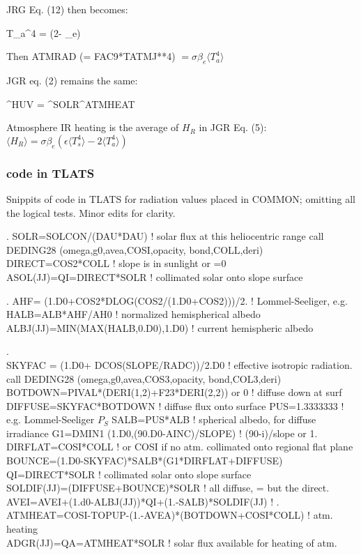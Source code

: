 JRG Eq. (12) then becomes:

 \qbn \langle T_a^4 \rangle =  
{ \sigma (2- \epsilon \beta_e) }   

 Then ATMRAD (= FAC9*TATMJ**4) $= \sigma \beta_e  \langle T_a^4 \rangle $  

JGR eq. (2) remains the same:

\qbn {}^{HUV} = ^{SOLR}^{ATMHEAT} 


Atmosphere IR heating is the average of $H_R$ in JGR Eq. (5): 
$ \langle H_R \rangle = \sigma \beta_e \left( \epsilon  \langle T_s^4 \rangle - 2 \langle T_a^4 \rangle \right) $

\subsubsection{code in TLATS}
Snippits of code in TLATS for radiation values placed in COMMON; omitting all the logical tests.  Minor edits for clarity.

.
\qi  SOLR=SOLCON/(DAU*DAU)     ! solar flux at this heliocentric range
\qi  call DEDING28 (omega,g0,avea,COSI,opacity, bond,COLL,deri)
\qi  DIRECT=COS2*COLL     ! slope is in sunlight  or =0
 \\ ASOL(JJ)=QI=DIRECT*SOLR         ! collimated solar onto slope surface

.
\qi  AHF= (1.D0+COS2*DLOG(COS2/(1.D0+COS2)))/2. ! Lommel-Seeliger, e.g.
\qi  HALB=ALB*AHF/AH0     ! normalized hemispherical albedo
\\ ALBJ(JJ)=MIN(MAX(HALB,0.D0),1.D0) ! current hemispheric albedo

.
\\ SKYFAC = (1.D0+ DCOS(SLOPE/RADC))/2.D0 ! effective isotropic radiation.
\qii   call DEDING28 (omega,g0,avea,COS3,opacity, bond,COL3,deri)
\qii   BOTDOWN=PIVAL*(DERI(1,2)+F23*DERI(2,2))  or 0 ! diffuse down at surf
\qi  DIFFUSE=SKYFAC*BOTDOWN ! diffuse flux onto surface
\qii   PUS=1.3333333    ! e.g. Lommel-Seeliger  $P_S$
\qii   SALB=PUS*ALB              ! spherical albedo, for diffuse irradiance
\qii   G1=DMIN1 (1.D0,(90.D0-AINC)/SLOPE) ! (90-i)/slope   or 1.
\qii   DIRFLAT=COSI*COLL ! or COSI if no atm. collimated onto regional flat plane
\qi   BOUNCE=(1.D0-SKYFAC)*SALB*(G1*DIRFLAT+DIFFUSE)   
\qi         QI=DIRECT*SOLR         ! collimated solar onto slope surface
\\ SOLDIF(JJ)=(DIFFUSE+BOUNCE)*SOLR ! all diffuse, = but the direct.
\\ AVEI=AVEI+(1.d0-ALBJ(JJ))*QI+(1.-SALB)*SOLDIF(JJ) !
.
\qi  ATMHEAT=COSI-TOPUP-(1.-AVEA)*(BOTDOWN+COSI*COLL) ! atm. heating
\\ ADGR(JJ)=QA=ATMHEAT*SOLR        ! solar flux available for heating of atm.

